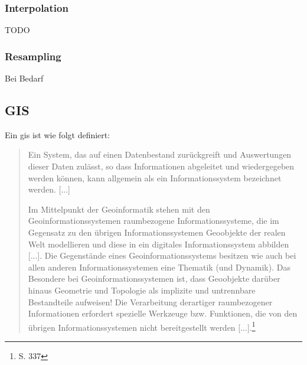 \subsubsection{Interpolation}
TODO

\subsubsection{Resampling}
Bei Bedarf


\subsection{GIS}
\label{grundlagen:gis}

Ein \Gls{gis} ist wie folgt definiert:
\begin{quote}
Ein System,  das  auf einen Datenbestand zurückgreift und Auswertungen dieser Daten zulässt,  so dass Informationen abgeleitet und wiedergegeben werden können,  kann  allgemein  als  ein  Informationssystem  bezeichnet  werden. [...]

Im Mittelpunkt  der  Geoinformatik  stehen  mit den  Geoinformationssystemen raumbezogene Informationssysteme, die im Gegensatz zu den übrigen Informationssystemen Geoobjekte  der realen Welt modellieren und diese in ein digitales Informationssystem abbilden [...]. Die Gegenstände eines Geoinformationssystems  besitzen  wie  auch  bei  allen  anderen  Informationssystemen  eine 
Thematik (und Dynamik). Das Besondere bei Geoinformationssystemen ist, dass Geoobjekte darüber hinaus Geometrie und Topologie als implizite und untrennbare Bestandteile aufweisen!  Die Verarbeitung derartiger raumbezogener Informationen erfordert spezielle Werkzeuge bzw. Funktionen, die von den übrigen Informationssystemen nicht bereitgestellt werden [...].\footnote{\cite{book:gi-theopluspraxis3} S. 337}
\end{quote}


